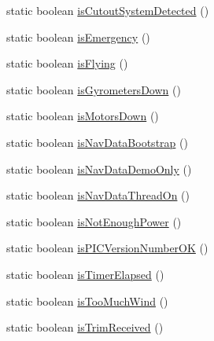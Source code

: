 \begin{DoxyCompactItemize}
\item 
static boolean \hyperlink{classworkspace_1_1_a_r_drone_nav_data_1_1src_1_1controller_1_1_drone_test_a6eda61e8a6f7f022ec292ed571d5af48}{is\+Cutout\+System\+Detected} ()
\item 
static boolean \hyperlink{classworkspace_1_1_a_r_drone_nav_data_1_1src_1_1controller_1_1_drone_test_a72f5ee07afe6824cae1176d83f0f314b}{is\+Emergency} ()
\item 
static boolean \hyperlink{classworkspace_1_1_a_r_drone_nav_data_1_1src_1_1controller_1_1_drone_test_ac70704a28dcbabdb664bd5d9f5f17a96}{is\+Flying} ()
\item 
static boolean \hyperlink{classworkspace_1_1_a_r_drone_nav_data_1_1src_1_1controller_1_1_drone_test_a6a38dc032e843e85c444f3176af72f74}{is\+Gyrometers\+Down} ()
\item 
static boolean \hyperlink{classworkspace_1_1_a_r_drone_nav_data_1_1src_1_1controller_1_1_drone_test_a3bcffe5c289ed0f6b680a4c2583b4e61}{is\+Motors\+Down} ()
\item 
static boolean \hyperlink{classworkspace_1_1_a_r_drone_nav_data_1_1src_1_1controller_1_1_drone_test_a07e6428dbf1d944cfc85343e0c8406de}{is\+Nav\+Data\+Bootstrap} ()
\item 
static boolean \hyperlink{classworkspace_1_1_a_r_drone_nav_data_1_1src_1_1controller_1_1_drone_test_a8b2684c51c76a5824115356d6045cc5e}{is\+Nav\+Data\+Demo\+Only} ()
\item 
static boolean \hyperlink{classworkspace_1_1_a_r_drone_nav_data_1_1src_1_1controller_1_1_drone_test_a1a9d9619adeb670b11e1c1f5dd7377a6}{is\+Nav\+Data\+Thread\+On} ()
\item 
static boolean \hyperlink{classworkspace_1_1_a_r_drone_nav_data_1_1src_1_1controller_1_1_drone_test_a1713b587440e0a9dfbc5bf4c42db6c76}{is\+Not\+Enough\+Power} ()
\item 
static boolean \hyperlink{classworkspace_1_1_a_r_drone_nav_data_1_1src_1_1controller_1_1_drone_test_aad8b56118f3994a3e133a950be802f35}{is\+P\+I\+C\+Version\+Number\+O\+K} ()
\item 
static boolean \hyperlink{classworkspace_1_1_a_r_drone_nav_data_1_1src_1_1controller_1_1_drone_test_a6f80c21a96fb28c0bf56d2d6f6d94d7b}{is\+Timer\+Elapsed} ()
\item 
static boolean \hyperlink{classworkspace_1_1_a_r_drone_nav_data_1_1src_1_1controller_1_1_drone_test_a65ef667b78705d1f2f292e7e406995cf}{is\+Too\+Much\+Wind} ()
\item 
static boolean \hyperlink{classworkspace_1_1_a_r_drone_nav_data_1_1src_1_1controller_1_1_drone_test_a2d3bcec3290f5c7d2bd38f6ba00400a0}{is\+Trim\+Received} ()

\end{DoxyCompactItemize}
